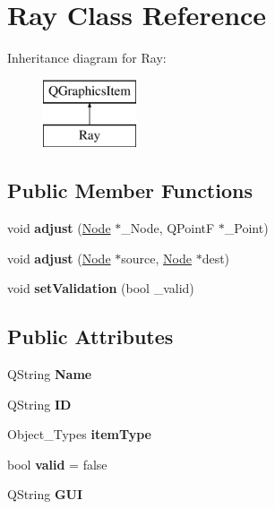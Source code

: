 \hypertarget{class_ray}{}\section{Ray Class Reference}
\label{class_ray}
Inheritance diagram for Ray\+:\begin{figure}[H]
\begin{center}
\leavevmode
\includegraphics[height=2.000000cm]{class_ray}
\end{center}
\end{figure}
\subsection*{Public Member Functions}
\begin{DoxyCompactItemize}
\item 
\mbox{\label{class_ray_acf1a322f4bb121e0004dc9582d8094c8}} 
void {\bfseries adjust} (\hyperlink{class_node}{Node} $\ast$\+\_\+\+Node, Q\+PointF $\ast$\+\_\+\+Point)
\item 
\mbox{\label{class_ray_a8e4abf2dca53cc354cc8136b9e5f140c}} 
void {\bfseries adjust} (\hyperlink{class_node}{Node} $\ast$source, \hyperlink{class_node}{Node} $\ast$dest)
\item 
\mbox{\label{class_ray_a7af6423f137bf56977bd30b90651bab2}} 
void {\bfseries set\+Validation} (bool \+\_\+valid)
\end{DoxyCompactItemize}
\subsection*{Public Attributes}
\begin{DoxyCompactItemize}
\item 
\mbox{\label{class_ray_aaffa7637ce0573c0c98e110568c217ec}} 
Q\+String {\bfseries Name}
\item 
\mbox{\label{class_ray_a6a824d281638ec920dcc3c2c4c28f35b}} 
Q\+String {\bfseries ID}
\item 
\mbox{\label{class_ray_a1e25f9e6daf861f2c05e8180788f3e2d}} 
Object\+\_\+\+Types {\bfseries item\+Type}
\item 
\mbox{\label{class_ray_a00c1c0893ea5fa2de5cb445f45e41df8}} 
bool {\bfseries valid} = false
\item 
\mbox{\label{class_ray_af2a776e487264ffad9a2eca41025d5f8}} 
Q\+String {\bfseries G\+UI}
\end{DoxyCompactItemize}
